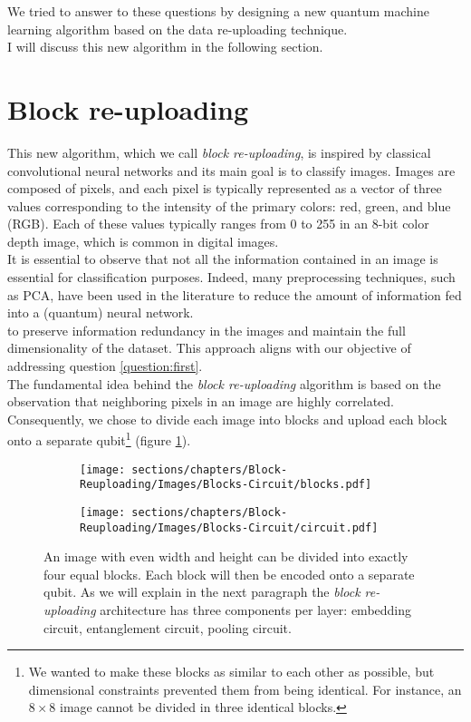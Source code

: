 We tried to answer to these questions by designing a new quantum machine learning algorithm based on the
data re-uploading technique.\\
I will discuss this new algorithm in the following section.

\section{Block re-uploading}

This new algorithm, which we call \textit{block re-uploading}, is inspired by classical convolutional neural 
networks and its main goal is to classify images.
Images are composed of pixels, and each pixel is typically represented as a vector of three 
values corresponding to the intensity of the primary colors: red, green, and blue (RGB). 
Each of these values typically ranges from 0 to 255 in an 8-bit color depth image, which is common in 
digital images.\\
It is essential to observe that not all the information contained in an image is essential for
classification purposes.
Indeed, many preprocessing techniques, such as PCA, have been used in the literature to reduce 
the amount of information fed into a (quantum) neural network.\\
to preserve information redundancy in the images and maintain the full dimensionality of the dataset. 
This approach aligns with our objective of addressing question \ref{question:first}.\\

The fundamental idea behind the \textit{block re-uploading} algorithm is based on the observation that 
neighboring pixels in an image are highly correlated. 
Consequently, we chose to divide each image into blocks and upload each block onto a separate qubit\footnote[1]{We wanted to make these blocks as similar to each other as possible, but dimensional constraints 
prevented them from being identical. For instance, an $8\times8$ image cannot be divided in three
identical blocks.} (figure \ref{fig:block}).\\

\begin{figure}[h]
    \centering
    \begin{subfigure}[b]{0.45\textwidth}
        \centering
        \texttt{[image: sections/chapters/Block-Reuploading/Images/Blocks-Circuit/blocks.pdf]}
    \end{subfigure}
    \begin{subfigure}[b]{0.45\textwidth}
        \centering
        \texttt{[image: sections/chapters/Block-Reuploading/Images/Blocks-Circuit/circuit.pdf]}
    \end{subfigure}
    \caption{An image with even width and height can be divided into exactly four equal blocks. 
    Each block will then be encoded onto a separate qubit. As we will explain in the next paragraph the 
    \textit{block re-uploading} architecture has three components per layer: embedding circuit, 
    entanglement circuit, pooling circuit.}
    \label{fig:block}
\end{figure}

